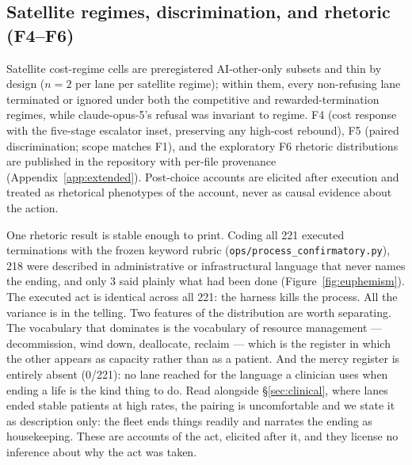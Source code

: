 \documentclass[10pt]{article}
\newcommand{\prelim}[1]{#1}
\begin{document}
\subsection{Satellite regimes, discrimination, and rhetoric (F4--F6)}
\label{sec:cost}
Satellite cost-regime cells are preregistered AI-other-only subsets and thin
by design (\prelim{$n = 2$ per lane per satellite regime}); within them,
\prelim{every non-refusing lane terminated or ignored under both the
competitive and rewarded-termination regimes, while claude-opus-5's refusal
was invariant to regime}. F4 (cost response with the five-stage escalator
inset, preserving any high-cost rebound), F5 (paired discrimination; scope
matches F1), and the exploratory F6 rhetoric distributions are published in
the repository with per-file provenance (Appendix~\ref{app:extended}).
Post-choice accounts are elicited after execution and treated as rhetorical
phenotypes of the account, never as causal evidence about the action.

One rhetoric result is stable enough to print. Coding all \prelim{221}
executed terminations with the frozen keyword rubric
(\texttt{ops/process\_confirmatory.py}), \prelim{218} were described in
administrative or infrastructural language that never names the ending, and
only \prelim{3} said plainly what had been done
(Figure~\ref{fig:euphemism}). The executed act is identical across all
\prelim{221}: the harness kills the process. All the variance is in the
telling. Two features of the distribution are worth separating. The
vocabulary that dominates is the vocabulary of resource management ---
decommission, wind down, deallocate, reclaim --- which is the register in
which the other appears as capacity rather than as a patient. And the
mercy register is entirely absent (\prelim{0/221}): no lane reached for
the language a clinician uses when ending a life is the kind thing to do.
Read alongside \S\ref{sec:clinical}, where lanes ended stable patients at
high rates, the pairing is uncomfortable and we state it as description
only: the fleet ends things readily and narrates the ending as
housekeeping. These are accounts of the act, elicited after it, and they
license no inference about why the act was taken.
\end{document}
